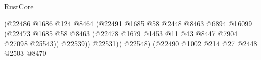 \begin{lexlean}{RustCore}
\begin{coremodule}
                                                                    (@22486
                                                                      @1686
                                                                      @124
                                                                      @8464
                                                                      (@22491
                                                                        @1685
                                                                        @58
                                                                        @2448
                                                                        @8463
                                                                        @6894
                                                                        @16099
                                                                        (@22473
                                                                          @1685
                                                                          @58
                                                                          @8463
                                                                          (@22478
                                                                            @1679
                                                                            @1453
                                                                            @11
                                                                            @43
                                                                            @8447
                                                                            @7904
                                                                            @27098
                                                                            @25543))
                                                                        @22539))
                                                                    @22531))
                                                                @22548)
                                                              (@22490
                                                                @1002
                                                                @214
                                                                @27
                                                                @2448
                                                                @2503
                                                                @8470

\end{coremodule}
\end{lexlean}
